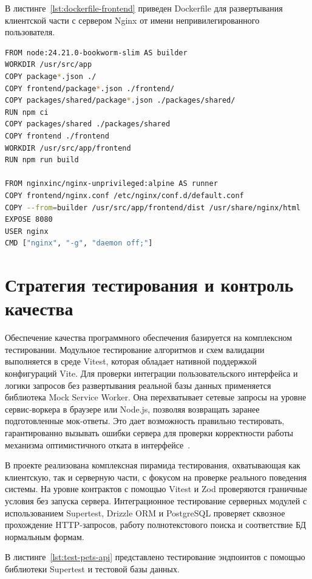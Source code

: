 \documentclass[a4paper,14pt]{extreport}
\begin{document}
В листинге~\ref{lst:dockerfile-frontend} приведен Dockerfile для развертывания клиентской части с сервером Nginx от имени непривилегированного пользователя.

\begin{lstlisting}[language=bash, caption={Многоэтапный Dockerfile для развертывания клиентской части}, label={lst:dockerfile-frontend}]
FROM node:24.21.0-bookworm-slim AS builder
WORKDIR /usr/src/app
COPY package*.json ./
COPY frontend/package*.json ./frontend/
COPY packages/shared/package*.json ./packages/shared/
RUN npm ci
COPY packages/shared ./packages/shared
COPY frontend ./frontend
WORKDIR /usr/src/app/frontend
RUN npm run build

FROM nginxinc/nginx-unprivileged:alpine AS runner
COPY frontend/nginx.conf /etc/nginx/conf.d/default.conf
COPY --from=builder /usr/src/app/frontend/dist /usr/share/nginx/html
EXPOSE 8080
USER nginx
CMD ["nginx", "-g", "daemon off;"]
\end{lstlisting}

\section{Стратегия тестирования и контроль качества}

Обеспечение качества программного обеспечения базируется на комплексном тестировании. Модульное тестирование алгоритмов и схем валидации выполняется в среде Vitest, которая обладает нативной поддержкой конфигураций Vite. Для проверки интеграции пользовательского интерфейса и логики запросов без развертывания реальной базы данных применяется библиотека Mock Service Worker. Она перехватывает сетевые запросы на уровне сервис-воркера в браузере или Node.js, позволяя возвращать заранее подготовленные мок-ответы. Это дает возможность правильно тестировать, гарантированно вызывать ошибки сервера для проверки корректности работы механизма оптимистичного отката в интерфейсе~\cite{ref17}.

В проекте реализована комплексная пирамида тестирования, охватывающая как клиентскую, так и серверную части, с фокусом на проверке реального поведения системы. На уровне контрактов с помощью Vitest и Zod проверяются граничные условия без запуска сервера. Интеграционное тестирование серверных модулей с использованием Supertest, Drizzle ORM и PostgreSQL проверяет сквозное прохождение HTTP-запросов, работу полнотекстового поиска и соответствие БД нормальным формам.

В листинге~\ref{lst:test-pets-api} представлено тестирование эндпоинтов с помощью библиотеки Supertest и тестовой базы данных.
\end{document}
